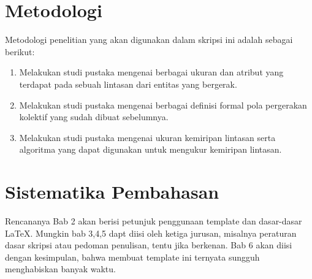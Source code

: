 \section{Metodologi}
\label{sec:metlit}

Metodologi penelitian yang akan digunakan dalam skripsi ini adalah sebagai berikut:

\begin{enumerate}
    \item Melakukan studi pustaka mengenai berbagai ukuran dan atribut yang terdapat pada sebuah lintasan dari entitas yang bergerak.
    \item Melakukan studi pustaka mengenai berbagai definisi formal pola pergerakan kolektif yang sudah dibuat sebelumnya.
    \item Melakukan studi pustaka mengenai ukuran kemiripan lintasan serta algoritma yang dapat digunakan untuk mengukur kemiripan lintasan.
\end{enumerate}

\section{Sistematika Pembahasan}
\label{sec:sispem}
Rencananya Bab 2 akan berisi petunjuk penggunaan template dan dasar-dasar \LaTeX.
Mungkin bab 3,4,5 dapt diisi oleh ketiga jurusan, misalnya peraturan dasar skripsi atau pedoman penulisan, tentu jika berkenan.
Bab 6 akan diisi dengan kesimpulan, bahwa membuat template ini ternyata sungguh menghabiskan banyak waktu.

